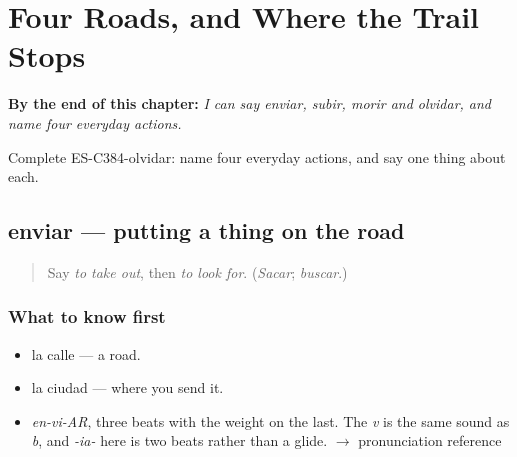 
\chapter{Four Roads, and Where the Trail Stops}
\label{ch:enviar-y-subir}

\begin{chapteropening}
\textbf{By the end of this chapter:} \emph{I can say enviar, subir, morir and olvidar, and name four everyday actions.}

Complete ES-C384-olvidar: name four everyday actions, and say one thing about each.
\end{chapteropening}

\section[enviar]{enviar — putting a thing on the road}

\label{lesson:ES-C384-enviar}



\begin{quote}
Say \emph{to take out}, then \emph{to look for}. (\emph{Sacar}; \emph{buscar}.)
\end{quote}

\subsection*{What to know first}
\begin{itemize}
\raggedright
  \item la calle — a road.
  \item la ciudad — where you send it.
\end{itemize}

\begin{sounds}
\begin{itemize}
\raggedright
  \item \emph{en-vi-AR}, three beats with the weight on the last. The \emph{v} is the same sound as \emph{b}, and \emph{-ia-} here is two beats rather than a glide. $\to$ pronunciation reference
\end{itemize}
\end{sounds}


